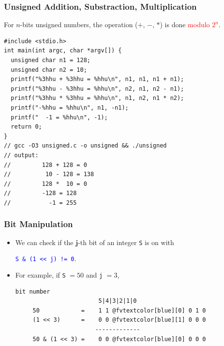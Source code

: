 \documentclass{beamer}
\begin{document}
\begin{frame}[fragile]
\frametitle{Unsigned Addition, Substraction, Multiplication}
\scriptsize

For $n$-bits unsigned numbers, the operation ($+$, $-$, $*$) is done \textcolor{red}{modulo $2^n$}.

\vspace{0.2cm}

\begin{lstlisting}
#include <stdio.h>
int main(int argc, char *argv[]) {
  unsigned char n1 = 128;
  unsigned char n2 = 10;
  printf("%3hhu + %3hhu = %hhu\n", n1, n1, n1 + n1);
  printf("%3hhu - %3hhu = %hhu\n", n2, n1, n2 - n1);
  printf("%3hhu * %3hhu = %hhu\n", n1, n2, n1 * n2);
  printf("-%hhu = %hhu\n", n1, -n1);
  printf("  -1 = %hhu\n", -1);
  return 0;
}
// gcc -O3 unsigned.c -o unsigned && ./unsigned
// output:
//         128 + 128 = 0
//          10 - 128 = 138
//         128 *  10 = 0
//         -128 = 128
//           -1 = 255
\end{lstlisting}

\end{frame}

\begin{frame}[fragile]
\frametitle{Bit Manipulation}

\begin{itemize}

\item We can check if the $\mathbf{j}$-th bit of an integer \verb+S+ is on with\\
\begin{center}
\textcolor{blue}{\texttt{S \& (1 << j) != 0}}.
\end{center}

\vspace{0.3cm}

\item For example, if \verb+S+ $= 50$ and \verb+j+ $= 3$,
\vspace{0.1cm}

\begin{center}
\begin{Verbatim}[commandchars=@\[\]]
                         bit number
                        5|4|3|2|1|0
     50            =    1 1 @fvtextcolor[blue][0] 0 1 0
     (1 << 3)      =    0 0 @fvtextcolor[blue][1] 0 0 0
                       -------------
     50 & (1 << 3) =    0 0 @fvtextcolor[blue][0] 0 0 0
\end{Verbatim}
\end{center}

\end{itemize}

\end{frame}
\end{document}

